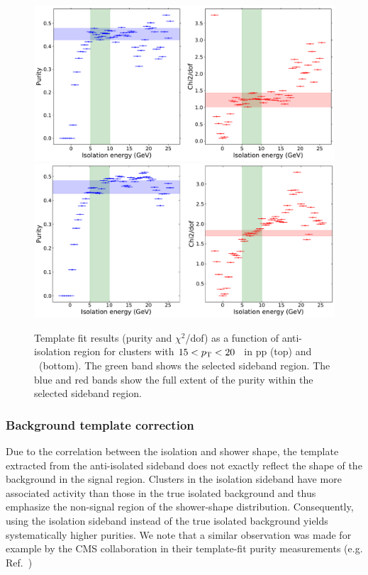 \begin{figure}[h]
\center
\includegraphics[width=1.0\textwidth]{Purity/antiiso-selection-pp-cluster_Lambda-15-20.pdf}\\
\includegraphics[width=1.0\textwidth]{Purity/antiiso-selection-p-Pb-cluster_Lambda-15-20.pdf}
\caption{Template fit results (purity and $\chi^2$/dof) as a function of anti-isolation region for clusters with $15 < p_{\mathrm{T}} < 20$ \GeVc~in pp (top) and \pPb~(bottom). The green band shows the selected sideband region. The blue and red bands show the full extent of the purity within the selected sideband region.}
\label{sidebandslices}
\end{figure}

\subsubsection{Background template correction}
\label{sec:bkgtemplatecorrection}
Due to the correlation between the isolation and shower shape, the template extracted from the anti-isolated sideband does not exactly reflect the shape of the background in the signal region. Clusters in the isolation sideband have more associated activity than those in the true isolated background and thus emphasize the non-signal region of the shower-shape distribution. Consequently, using the isolation sideband instead of the true isolated background yields systematically higher purities. We note that a similar observation was made for example by the CMS collaboration in their template-fit purity measurements (e.g. Ref.~\cite{Sirunyan:2017qhf})

